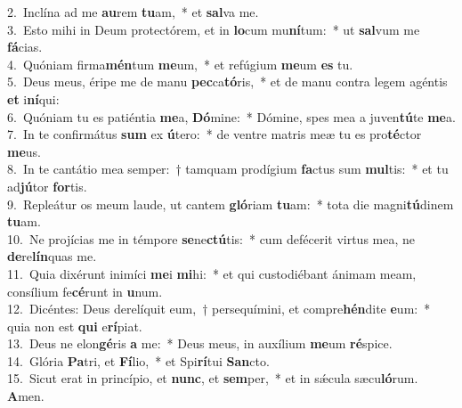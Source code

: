{2.~}Inclína ad me \textbf{au}rem \textbf{tu}am,~* et \textbf{sal}va me.\\
{3.~}Esto mihi in Deum protectórem, et in \textbf{lo}cum mu\textbf{ní}tum:~* ut \textbf{sal}vum me \textbf{fá}cias.\\
{4.~}Quóniam firma\textbf{mén}tum \textbf{me}um,~* et refúgium \textbf{me}um \textbf{es} tu.\\
{5.~}Deus meus, éripe me de manu \textbf{pec}ca\textbf{tó}ris,~* et de manu contra legem agéntis \textbf{et} i\textbf{ní}qui:\\
{6.~}Quóniam tu es patiéntia \textbf{me}a, \textbf{Dó}mine:~* Dómine, spes mea a juven\textbf{tú}te \textbf{me}a.\\
{7.~}In te confirmátus \textbf{sum} ex \textbf{ú}tero:~* de ventre matris meæ tu es pro\textbf{té}ctor \textbf{me}us.\\
{8.~}In te cantátio mea semper:~† tamquam prodígium \textbf{fa}ctus sum \textbf{mul}tis:~* et tu ad\textbf{jú}tor \textbf{for}tis.\\
{9.~}Repleátur os meum laude, ut cantem \textbf{gló}riam \textbf{tu}am:~* tota die magni\textbf{tú}dinem \textbf{tu}am.\\
{10.~}Ne projícias me in témpore \textbf{se}ne\textbf{ctú}tis:~* cum defécerit virtus mea, ne \textbf{de}re\textbf{lín}quas me.\\
{11.~}Quia dixérunt inimíci \textbf{me}i \textbf{mi}hi:~* et qui custodiébant ánimam meam, consílium fe\textbf{cé}runt in \textbf{u}num.\\
{12.~}Dicéntes: Deus derelíquit eum,~† persequímini, et compre\textbf{hén}dite \textbf{e}um:~* quia non est \textbf{qui} e\textbf{rí}piat.\\
{13.~}Deus ne elon\textbf{gé}ris \textbf{a} me:~* Deus meus, in auxílium \textbf{me}um \textbf{ré}spice.\\
{14.~}Glória \textbf{Pa}tri, et \textbf{Fí}lio,~* et Spi\textbf{rí}tui \textbf{San}cto.\\
{15.~}Sicut erat in princípio, et \textbf{nunc}, et \textbf{sem}per,~* et in sǽcula sæcu\textbf{ló}rum. \textbf{A}men.\\
